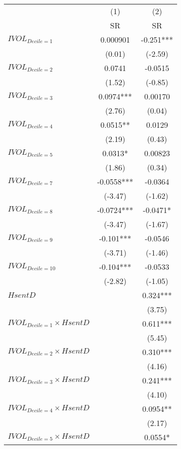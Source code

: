 \begin{tabular}{lcc}
\toprule
        & (1)     & (2) \\
        & SR      & SR \\
\midrule
$IVOL_{Decile = 1} $ & 0.000901 & -0.251*** \\
        & (0.01)  & (-2.59) \\
$IVOL_{Decile = 2} $ & 0.0741  & -0.0515 \\
        & (1.52)  & (-0.85) \\
$IVOL_{Decile = 3} $ & 0.0974*** & 0.00170 \\
        & (2.76)  & (0.04) \\
$IVOL_{Decile = 4} $ & 0.0515** & 0.0129 \\
        & (2.19)  & (0.43) \\
$IVOL_{Decile = 5} $ & 0.0313* & 0.00823 \\
        & (1.86)  & (0.34) \\
$IVOL_{Decile = 7} $ & -0.0558*** & -0.0364 \\
        & (-3.47) & (-1.62) \\
$IVOL_{Decile = 8} $ & -0.0724*** & -0.0471* \\
        & (-3.47) & (-1.67) \\
$IVOL_{Decile = 9} $ & -0.101*** & -0.0546 \\
        & (-3.71) & (-1.46) \\
$IVOL_{Decile = 10} $ & -0.104*** & -0.0533 \\
        & (-2.82) & (-1.05) \\
$HsentD$ &         & 0.324*** \\
        &         & (3.75) \\
$IVOL_{Decile = 1} \times HsentD$ &         & 0.611*** \\
        &         & (5.45) \\
$IVOL_{Decile = 2} \times HsentD$ &         & 0.310*** \\
        &         & (4.16) \\
$IVOL_{Decile = 3} \times HsentD$ &         & 0.241*** \\
        &         & (4.10) \\
$IVOL_{Decile = 4} \times HsentD$ &         & 0.0954** \\
        &         & (2.17) \\
$IVOL_{Decile = 5} \times HsentD$ &         & 0.0554* \\

\end{tabular}
